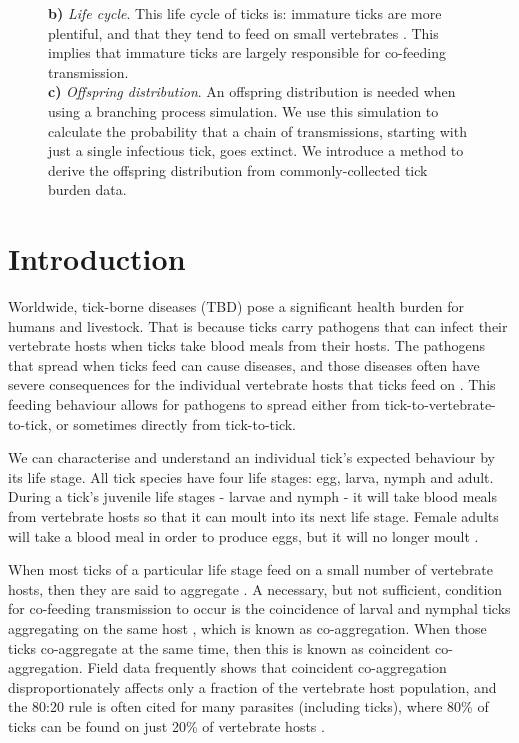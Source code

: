 \documentclass{article}
\begin{document}
\begin{figure}[h!]
{    \textbf{b)} \textit{Life cycle}. This life cycle of ticks is: immature ticks are more plentiful, and that they tend to feed on small vertebrates \cite{Randolph1998}. This implies that immature ticks are largely responsible for co-feeding transmission. \\
    \textbf{c)} \textit{Offspring distribution}. An offspring distribution is needed when using a branching process simulation. We use this simulation to calculate the probability that a chain of transmissions, starting with just a single infectious tick, goes extinct. We introduce a method to derive the offspring distribution from commonly-collected tick burden data.
    }
\end{figure}

\newpage

\tableofcontents

\newpage

\section{Introduction}

Worldwide, tick-borne diseases (TBD) pose a significant health burden for humans and livestock. That is because ticks carry pathogens that can infect their vertebrate hosts when ticks take blood meals from their hosts. The pathogens that spread when ticks feed can cause diseases, and those diseases often have severe consequences for the individual vertebrate hosts that ticks feed on \cite{Johnson2023e}. This feeding behaviour allows for pathogens to spread either from tick-to-vertebrate-to-tick, or sometimes directly from tick-to-tick.

We can characterise and understand an individual tick's expected behaviour by its life stage. All tick species have four life stages: egg, larva, nymph and adult. During a tick's juvenile life stages - larvae and nymph - it will take blood meals from vertebrate hosts so that it can moult into its next life stage. Female adults will take a blood meal in order to produce eggs, but it will no longer moult \cite{Johnson2023a}.

When most ticks of a particular life stage feed on a small number of vertebrate hosts, then they are said to aggregate \cite{JohnstoneRobertson2020}. A necessary, but not sufficient, condition for co-feeding transmission to occur is the coincidence of larval and nymphal ticks aggregating on the same host \cite{Ferreri2014}, which is known as co-aggregation. When those ticks co-aggregate at the same time, then this is known as coincident co-aggregation. Field data frequently shows that coincident co-aggregation disproportionately affects only a fraction of the vertebrate host population, and the 80:20 rule is often cited for many parasites (including ticks), where 80\% of ticks can be found on just 20\% of vertebrate hosts \cite{Woolhouse1997}.
\end{document}

